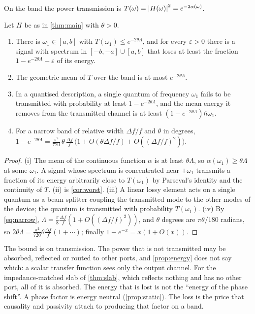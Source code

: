 On the band the power transmission is $T(\omega)=\left|H(\omega)\right|^2
=e^{-2\alpha(\omega)}$.

\begin{proposition}\label{prop:energy}
Let $H$ be as in \cref{thm:main} with $\theta>0$.
\begin{enumerate}
\item[(i)] There is $\omega_1\in[a,b]$ with $T(\omega_1)\le e^{-2\theta\Lambda}$,
and for every $\varepsilon>0$ there is a signal with spectrum in
$[-b,-a]\cup[a,b]$ that loses at least the fraction
$1-e^{-2\theta\Lambda}-\varepsilon$ of its energy.
\item[(ii)] The geometric mean of $T$ over the band is at most
$e^{-2\theta\Lambda}$.
\item[(iii)] In a quantised description, a single quantum of frequency
$\omega_1$ fails to be transmitted with probability at least
$1-e^{-2\theta\Lambda}$, and the mean energy it removes from the transmitted
channel is at least $(1-e^{-2\theta\Lambda})\hbar\omega_1$.
\item[(iv)] For a narrow band of relative width $\Delta f/f$ and
$\theta$ in degrees,
$1-e^{-2\theta\Lambda}=\frac{\pi^2}{720}\,\theta\,\frac{\Delta f}f\,
\big(1+O(\theta\Delta f/f)+O((\Delta f/f)^2)\big)$.
\end{enumerate}
\end{proposition}

\begin{proof}
(i) The mean of the continuous function $\alpha$ is at least $\theta\Lambda$,
so $\alpha(\omega_1)\ge\theta\Lambda$ at some $\omega_1$. A signal whose
spectrum is concentrated near $\pm\omega_1$ transmits a fraction of its
energy arbitrarily close to $T(\omega_1)$ by Parseval's identity and the
continuity of $T$. (ii) is \cref{cor:worst}. (iii) A linear lossy element
acts on a single quantum as a beam splitter coupling the transmitted mode
to the other modes of the device; the quantum is transmitted with
probability $T(\omega_1)$. (iv) By \eqref{eq:narrow}, $\Lambda=\frac\pi8\frac{\Delta f}{f}
(1+O((\Delta f/f)^2))$, and $\theta$ degrees are $\pi\theta/180$ radians, so
$2\theta\Lambda=\frac{\pi^2}{720}\theta\frac{\Delta f}f(1+\cdots)$; finally
$1-e^{-x}=x(1+O(x))$.
\end{proof}

The bound is on transmission. The power that is not transmitted may be
absorbed, reflected or routed to other ports, and \cref{prop:energy} does not
say which: a scalar transfer function sees only the output channel. For the
impedance-matched slab of \cref{thm:slab}, which reflects nothing and has no
other port, all of it is absorbed. The energy that is lost is not the
``energy of the phase shift''. A phase
factor is energy neutral (\cref{prop:static}). The loss is the price that
causality and passivity attach to producing that factor on a band.

